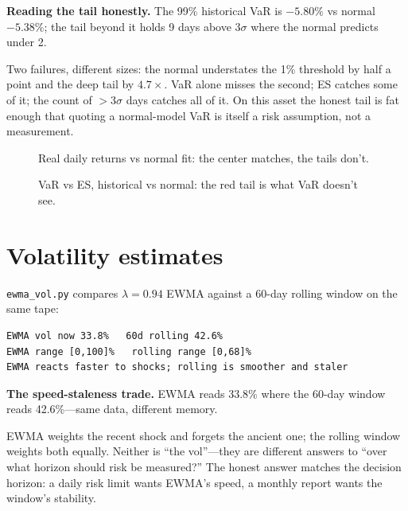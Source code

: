 \begin{example}\label{ex:var}
\textbf{Reading the tail honestly.} The 99\% historical VaR is $-5.80\%$ vs normal
$-5.38\%$; the tail beyond it holds 9 days above $3\sigma$ where the normal predicts
under 2.
\begin{solution}
Two failures, different sizes: the normal understates the 1\% threshold by half a point
and the deep tail by $4.7\times$. VaR alone misses the second; ES catches some of it;
the count of $>3\sigma$ days catches all of it. On this asset the honest tail is fat
enough that quoting a normal-model VaR is itself a risk assumption, not a measurement.
\end{solution}
\end{example}

\begin{figure}[htbp]\centering

\caption{Real daily returns vs normal fit: the center matches, the tails don't.}
\label{fig:rhist}
\end{figure}

\begin{figure}[htbp]\centering

\caption{VaR vs ES, historical vs normal: the red tail is what VaR doesn't see.}
\label{fig:var}
\end{figure}

\section{Volatility estimates}\label{sec:volet}

\texttt{ewma\_vol.py} compares $\lambda{=}0.94$ EWMA against a 60-day rolling window on
the same tape:
\begin{lstlisting}[numbers=none]
EWMA vol now 33.8%   60d rolling 42.6%
EWMA range [0,100]%   rolling range [0,68]%
EWMA reacts faster to shocks; rolling is smoother and staler
\end{lstlisting}

\begin{example}\label{ex:ewma}
\textbf{The speed-staleness trade.} EWMA reads 33.8\% where the 60-day window reads
42.6\%---same data, different memory.
\begin{solution}
EWMA weights the recent shock and forgets the ancient one; the rolling window weights
both equally. Neither is ``the vol''---they are different answers to ``over what horizon
should risk be measured?'' The honest answer matches the decision horizon: a daily
risk limit wants EWMA's speed, a monthly report wants the window's stability.
\end{solution}
\end{example}

